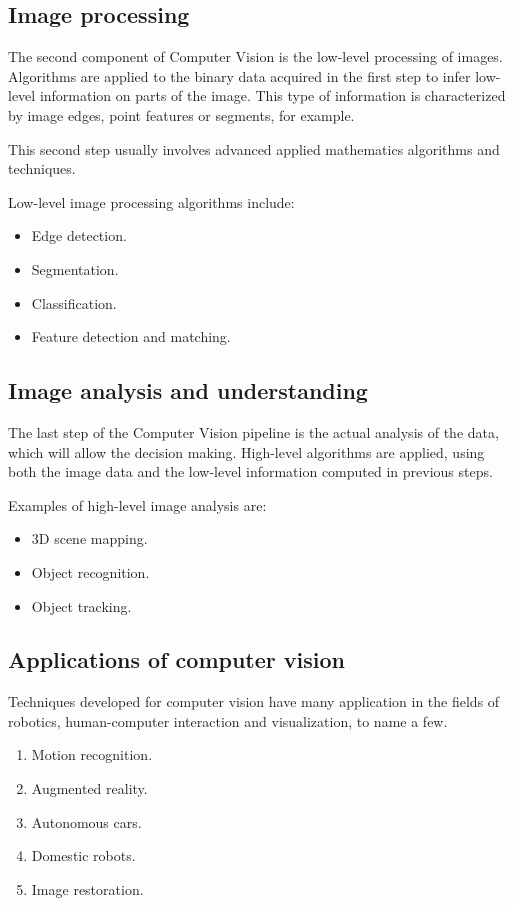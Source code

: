 \subsection{Image processing}
The second component of Computer Vision is the low-level processing of images. Algorithms are applied to the binary data acquired in the first step to infer low-level information on parts of the image. This type of information is characterized by image edges, point features or segments, for example.

This second step usually involves advanced applied mathematics algorithms and techniques.

Low-level image processing algorithms include:
\begin{itemize}
    \item Edge detection.
    \item Segmentation.
    \item Classification.
    \item Feature detection and matching.
\end{itemize}

\subsection{Image analysis and understanding}
The last step of the Computer Vision pipeline is the actual analysis of the data, which will allow the decision making.
High-level algorithms are applied, using both the image data and the low-level information computed in previous steps.

Examples of high-level image analysis are:
\begin{itemize}
    \item 3D scene mapping.
    \item Object recognition.
    \item Object tracking.
\end{itemize}
\subsection{Applications of computer vision}
Techniques developed for computer vision have many application in the fields of robotics, human-computer interaction and visualization, to name a few.
\begin{enumerate}
    \item Motion recognition.
    \item Augmented reality.
    \item Autonomous cars.
    \item Domestic robots.
    \item Image restoration.
\end{enumerate}

